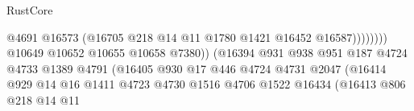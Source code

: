 \begin{lexlean}{RustCore}
\begin{coremodule}
                                                            @4691
                                                            @16573
                                                            (@16705
                                                              @218
                                                              @14
                                                              @11
                                                              @1780
                                                              @1421
                                                              @16452
                                                              @16587))))))))
                                              @10649
                                              @10652
                                              @10655
                                              @10658
                                              @7380))
                                          (@16394
                                            @931
                                            @938
                                            @951
                                            @187
                                            @4724
                                            @4733
                                            @1389
                                            @4791
                                            (@16405
                                              @930
                                              @17
                                              @446
                                              @4724
                                              @4731
                                              @2047
                                              (@16414
                                                @929
                                                @14
                                                @16
                                                @1411
                                                @4723
                                                @4730
                                                @1516
                                                @4706
                                                @1522
                                                @16434
                                                (@16413
                                                  @806
                                                  @218
                                                  @14
                                                  @11

\end{coremodule}
\end{lexlean}
